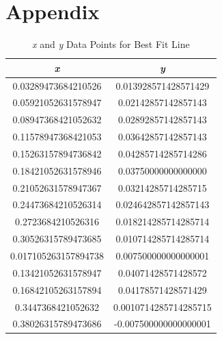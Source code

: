 \documentclass[12pt]{article}
\numberwithin{equation}{section}
\begin{document}
\section{Appendix}
\begin{table}[h!]
\centering
\begin{tabular}{|c|c|}
\hline
\textit{x} & \textit{y} \\ \hline
0.03289473684210526 & 0.013928571428571429 \\
0.05921052631578947 & 0.02142857142857143 \\
0.08947368421052632 & 0.02892857142857143 \\
0.11578947368421053 & 0.03642857142857143 \\
0.15263157894736842 & 0.04285714285714286 \\
0.18421052631578946 & 0.03750000000000000 \\
0.21052631578947367 & 0.03214285714285715 \\
0.24473684210526314 & 0.024642857142857143 \\
0.2723684210526316 & 0.018214285714285714 \\
0.30526315789473685 & 0.010714285714285714 \\
0.017105263157894738 & 0.007500000000000001 \\
0.13421052631578947 & 0.04071428571428572 \\
0.16842105263157894 & 0.04178571428571429 \\
0.3447368421052632 & 0.0010714285714285715 \\
0.38026315789473686 & -0.007500000000000001 \\ \hline
\end{tabular}
\caption{\textit{x} and \textit{y} Data Points for Best Fit Line}
\label{table:xydata}
\end{table}
\end{document}

